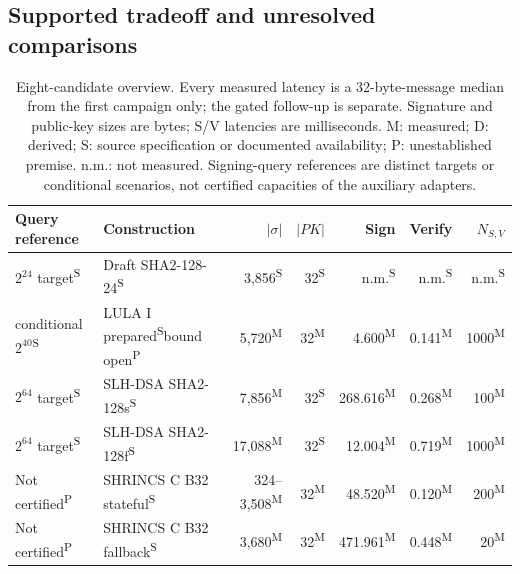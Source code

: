 \subsection{Supported tradeoff and unresolved comparisons}
\begin{table}[!htbp]
\caption{Eight-candidate overview. Every measured latency is a 32-byte-message median from the first campaign only; the gated follow-up is separate. Signature and public-key sizes are bytes; S/V latencies are milliseconds. M: measured; D: derived; S: source specification or documented availability; P: unestablished premise. n.m.: not measured. Signing-query references are distinct targets or conditional scenarios, not certified capacities of the auxiliary adapters.}\label{tab:comparison-overview}
\centering\scriptsize\setlength{\tabcolsep}{2pt}
\begin{tabular}{P{20mm}P{25mm}rrrrr}\toprule
Query reference & Construction & $|\sigma|$ & $|PK|$ & Sign & Verify & $N_{S,V}$\\\midrule
$2^{24}$ target\textsuperscript{S} & Draft SHA2-128-24\textsuperscript{S} & 3,856\textsuperscript{S} & 32\textsuperscript{S} & n.m.\textsuperscript{S} & n.m.\textsuperscript{S} & n.m.\textsuperscript{S}\\
conditional $2^{40}$\textsuperscript{S} & LULA I prepared\textsuperscript{S}\newline bound open\textsuperscript{P} & 5,720\textsuperscript{M} & 32\textsuperscript{M} & 4.600\textsuperscript{M} & 0.141\textsuperscript{M} & 1000\textsuperscript{M}\\
$2^{64}$ target\textsuperscript{S} & SLH-DSA SHA2-128s\textsuperscript{S} & 7,856\textsuperscript{M} & 32\textsuperscript{S} & 268.616\textsuperscript{M} & 0.268\textsuperscript{M} & 100\textsuperscript{M}\\
$2^{64}$ target\textsuperscript{S} & SLH-DSA SHA2-128f\textsuperscript{S} & 17,088\textsuperscript{M} & 32\textsuperscript{S} & 12.004\textsuperscript{M} & 0.719\textsuperscript{M} & 1000\textsuperscript{M}\\
Not certified\textsuperscript{P} & SHRINCS C B32 stateful\textsuperscript{S} & 324--3,508\textsuperscript{M} & 32\textsuperscript{M} & 48.520\textsuperscript{M} & 0.120\textsuperscript{M} & 200\textsuperscript{M}\\
Not certified\textsuperscript{P} & SHRINCS C B32 fallback\textsuperscript{S} & 3,680\textsuperscript{M} & 32\textsuperscript{M} & 471.961\textsuperscript{M} & 0.448\textsuperscript{M} & 20\textsuperscript{M}\\

\end{tabular}
\end{table}
